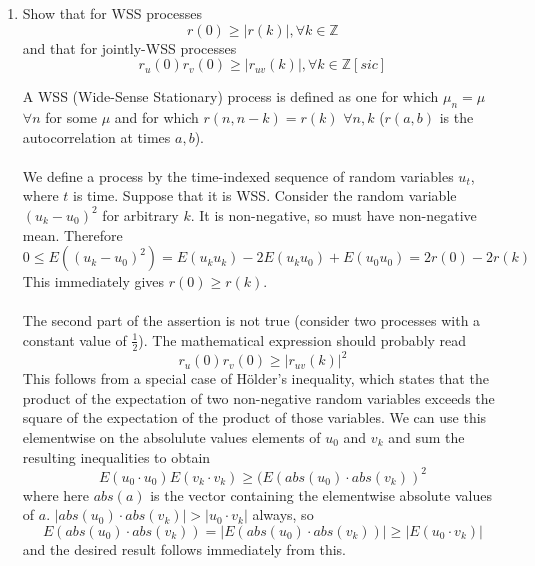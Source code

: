 \documentclass{article}
\newcommand{\chapternumber}{2}
\newenvironment{QandA}{\begin{enumerate}[label=\chapternumber.\arabic*]\bfseries\boldmath}
	{\end{enumerate}}
\newenvironment{answered}{\par\bigskip\normalfont\unboldmath}{}
\begin{document}
\begin{QandA}
	\item Show that for WSS processes
	\[r(0)\geq |r(k)|,\forall k\in \mathbb{Z}\]
	and that for jointly-WSS processes
	\[r_u(0)r_v(0)\geq|r_{uv}(k)|,\forall k\in \mathbb{Z}[sic]\]
	\begin{answered}
		A WSS (Wide-Sense Stationary) process is defined as one for which $\mu_n=\mu$ $\forall n$ for some $\mu$ and for which $r(n,n-k)=r(k)$ $\forall n,k$ ($r(a,b)$ is the autocorrelation at times $a,b$).\\
		\\
		We define a process by the time-indexed sequence of random variables $u_t$, where $t$ is time. Suppose that it is WSS. Consider the random variable $(u_k-u_0)^2$ for arbitrary $k$. It is non-negative, so must have non-negative mean. Therefore
		\[0\leq E((u_k-u_0)^2)=E(u_ku_k)-2E(u_ku_0)+E(u_0u_0)=2r(0)-2r(k)\]
		This immediately gives $r(0)\geq r(k)$.\\
		\\
		The second part of the assertion is not true (consider two processes with a constant value of $\frac{1}{2}$). The mathematical expression should probably read
		\[r_u(0)r_v(0)\geq|r_{uv}(k)|^2\]
		This follows from a special case of H{\"o}lder's inequality, which states that the product of the expectation of two non-negative random variables exceeds the square of the expectation of the product of those variables. We can use this elementwise on the absolulute values elements of $u_0$ and $v_k$ and sum the resulting inequalities to obtain
		\[E(u_0\cdot u_0)E(v_k\cdot v_k)\geq (E(abs(u_0)\cdot abs(v_k))^2\] 
		where here $abs(a)$ is the vector containing the elementwise absolute values of $a$. $|abs(u_0)\cdot abs(v_k)|>|u_0\cdot v_k|$ always, so 
		\[E(abs(u_0)\cdot abs(v_k))=|E(abs(u_0)\cdot abs(v_k))|\geq |E(u_0\cdot v_k)|\]
		and the desired result follows immediately from this.
	\end{answered}


\end{QandA}
\end{document}
